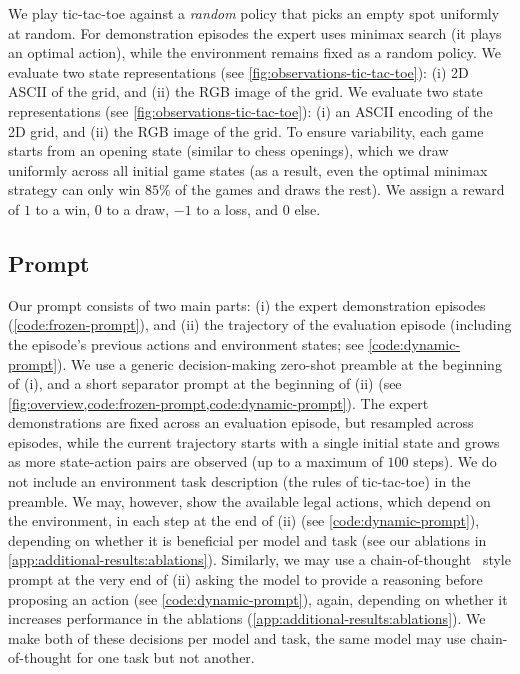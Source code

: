 We play tic-tac-toe against a \emph{random} policy that picks an empty spot uniformly at random.
For demonstration episodes the expert uses minimax search (\ie it plays an optimal action), while the environment remains fixed as a random policy.
\ificlr
We evaluate two state representations (see \cref{fig:observations-tic-tac-toe}): (i) 2D ASCII of the grid, and (ii) the RGB image of the grid.
\else
We evaluate two state representations (see \cref{fig:observations-tic-tac-toe}): (i) an ASCII encoding of the 2D grid, and (ii) the RGB image of the grid.
\fi
To ensure variability, each game starts from an opening state (similar to chess openings), which we draw uniformly across all initial game states (as a result, even the optimal minimax strategy can only win $85\%$ of the games and draws the rest).
We assign a reward of $1$ to a win, $0$ to a draw, $-1$ to a loss, and $0$ else.


\subsection{Prompt}
\label{sec:methods:prompt}

Our prompt consists of two main parts: (i) the expert demonstration episodes (\cref{code:frozen-prompt}), and (ii) the trajectory of the evaluation episode (including the episode's previous actions and environment states; see \cref{code:dynamic-prompt}).
We use a generic decision-making zero-shot preamble at the beginning of (i), and a short separator prompt at the beginning of (ii) (see \cref{fig:overview,code:frozen-prompt,code:dynamic-prompt}).
The expert demonstrations are fixed across an evaluation episode, but resampled across episodes, while the current trajectory starts with a single initial state and grows as more state-action pairs are observed (up to a maximum of $100$ steps).
We do not include an environment task description (\eg the rules of tic-tac-toe) in the preamble.
We may, however, show the available legal actions, which depend on the environment, in each step at the end of (ii) (see \cref{code:dynamic-prompt}), depending on whether it is beneficial per model and task (see our ablations in \cref{app:additional-results:ablations}).
Similarly, we may use a chain-of-thought~\citep{wei2022chain} style prompt at the very end of (ii) asking the model to provide a reasoning before proposing an action (see \cref{code:dynamic-prompt}), again, depending on whether it increases performance in the ablations (\cref{app:additional-results:ablations}).
We make both of these decisions per model and task, \ie the same model may use chain-of-thought for one task but not another.


